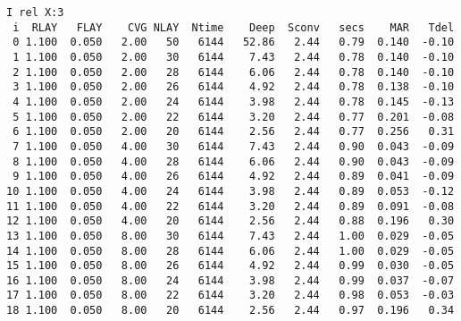 \documentclass{article}
\begin{document}
\begin{table}
\begin{verbatim}
I rel X:3
 i  RLAY   FLAY    CVG NLAY  Ntime    Deep  Sconv   secs    MAR   Tdel
 0 1.100  0.050   2.00   50   6144   52.86   2.44   0.79  0.140  -0.10
 1 1.100  0.050   2.00   30   6144    7.43   2.44   0.78  0.140  -0.10
 2 1.100  0.050   2.00   28   6144    6.06   2.44   0.78  0.140  -0.10
 3 1.100  0.050   2.00   26   6144    4.92   2.44   0.78  0.138  -0.10
 4 1.100  0.050   2.00   24   6144    3.98   2.44   0.78  0.145  -0.13
 5 1.100  0.050   2.00   22   6144    3.20   2.44   0.77  0.201  -0.08
 6 1.100  0.050   2.00   20   6144    2.56   2.44   0.77  0.256   0.31
 7 1.100  0.050   4.00   30   6144    7.43   2.44   0.90  0.043  -0.09
 8 1.100  0.050   4.00   28   6144    6.06   2.44   0.90  0.043  -0.09
 9 1.100  0.050   4.00   26   6144    4.92   2.44   0.89  0.041  -0.09
10 1.100  0.050   4.00   24   6144    3.98   2.44   0.89  0.053  -0.12
11 1.100  0.050   4.00   22   6144    3.20   2.44   0.89  0.091  -0.08
12 1.100  0.050   4.00   20   6144    2.56   2.44   0.88  0.196   0.30
13 1.100  0.050   8.00   30   6144    7.43   2.44   1.00  0.029  -0.05
14 1.100  0.050   8.00   28   6144    6.06   2.44   1.00  0.029  -0.05
15 1.100  0.050   8.00   26   6144    4.92   2.44   0.99  0.030  -0.05
16 1.100  0.050   8.00   24   6144    3.98   2.44   0.99  0.037  -0.07
17 1.100  0.050   8.00   22   6144    3.20   2.44   0.98  0.053  -0.03
18 1.100  0.050   8.00   20   6144    2.56   2.44   0.97  0.196   0.34
\end{verbatim}
\vspace{-3.0mm}
\hrulefill \end{table}  
\end{document}
